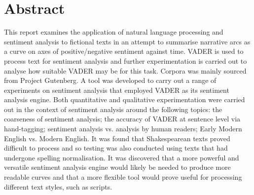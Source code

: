 \documentclass{article}
\begin{document}
\section*{Abstract}
    This report examines the application of natural language processing and sentiment analysis to fictional texts in an attempt to summarise narrative arcs as a curve on axes of positive/negative sentiment against time. VADER is used to process text for sentiment analysis and further experimentation is carried out to analyse how suitable VADER may be for this task. Corpora was mainly sourced from Project Gutenberg. A tool was developed to carry out a range of experiments on sentiment analysis that employed VADER as its sentiment analysis engine. Both quantitative and qualitative experimentation were carried out in the context of sentiment analysis around the following topics: the coarseness of sentiment analysis; the accuracy of VADER at sentence level via hand-tagging; sentiment analysis vs. analysis by human readers; Early Modern English vs. Modern English. It was found that Shakespearean texts proved difficult to process and so testing was also conducted using texts that had undergone spelling normalisation. It was discovered that a more powerful and versatile sentiment analysis engine would likely be needed to produce more readable curves and that a more flexible tool would prove useful for processing different text styles, such as scripts.
    \newline
    \newline
\end{document}
